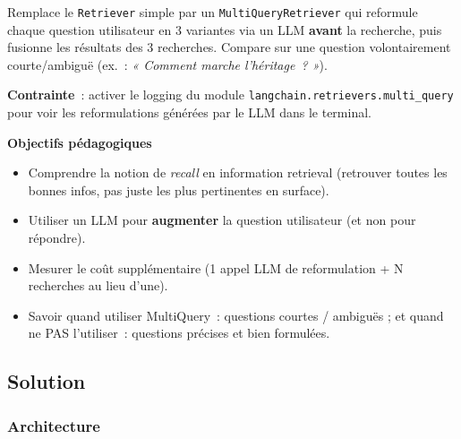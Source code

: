 \documentclass[11pt,a4paper]{article}
\begin{document}
\begin{tcolorbox}[title=Exercice bonus 5. Améliorer le recall avec un LLM en amont]
Remplace le \texttt{Retriever} simple par un \texttt{MultiQueryRetriever}
qui reformule chaque question utilisateur en 3 variantes via un LLM
\textbf{avant} la recherche, puis fusionne les résultats des 3 recherches.
Compare sur une question volontairement courte/ambiguë (ex.~: \emph{«
Comment marche l'héritage~? »}).

\textbf{Contrainte}~: activer le logging du module
\texttt{langchain.retrievers.multi\_query} pour voir les reformulations
générées par le LLM dans le terminal.

\bigskip
\noindent\textbf{Objectifs pédagogiques}
\begin{itemize}[leftmargin=*]
  \item Comprendre la notion de \emph{recall} en information retrieval
        (retrouver toutes les bonnes infos, pas juste les plus
        pertinentes en surface).
  \item Utiliser un LLM pour \textbf{augmenter} la question utilisateur
        (et non pour répondre).
  \item Mesurer le coût supplémentaire (1 appel LLM de reformulation +
        N recherches au lieu d'une).
  \item Savoir quand utiliser MultiQuery~: questions courtes / ambiguës ;
        et quand ne PAS l'utiliser~: questions précises et bien formulées.
\end{itemize}
\end{tcolorbox}

\subsection{Solution}

\subsubsection{Architecture}
\end{document}
